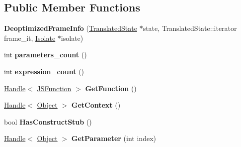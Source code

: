 \subsection*{Public Member Functions}
\begin{DoxyCompactItemize}
\item 
{\bfseries Deoptimized\+Frame\+Info} (\hyperlink{classv8_1_1internal_1_1_translated_state}{Translated\+State} $\ast$state, Translated\+State\+::iterator frame\+\_\+it, \hyperlink{classv8_1_1internal_1_1_isolate}{Isolate} $\ast$isolate)\hypertarget{classv8_1_1internal_1_1_deoptimized_frame_info_abcd9e3b305e42e71e91aa22fd0e74efc}{}\label{classv8_1_1internal_1_1_deoptimized_frame_info_abcd9e3b305e42e71e91aa22fd0e74efc}

\item 
int {\bfseries parameters\+\_\+count} ()\hypertarget{classv8_1_1internal_1_1_deoptimized_frame_info_ace9c74d42d04b117979611044f6adc68}{}\label{classv8_1_1internal_1_1_deoptimized_frame_info_ace9c74d42d04b117979611044f6adc68}

\item 
int {\bfseries expression\+\_\+count} ()\hypertarget{classv8_1_1internal_1_1_deoptimized_frame_info_a86000b47a892ff78f37787ed131e61c9}{}\label{classv8_1_1internal_1_1_deoptimized_frame_info_a86000b47a892ff78f37787ed131e61c9}

\item 
\hyperlink{classv8_1_1internal_1_1_handle}{Handle}$<$ \hyperlink{classv8_1_1internal_1_1_j_s_function}{J\+S\+Function} $>$ {\bfseries Get\+Function} ()\hypertarget{classv8_1_1internal_1_1_deoptimized_frame_info_addf293d436f9b12f7eda3b732fc08afd}{}\label{classv8_1_1internal_1_1_deoptimized_frame_info_addf293d436f9b12f7eda3b732fc08afd}

\item 
\hyperlink{classv8_1_1internal_1_1_handle}{Handle}$<$ \hyperlink{classv8_1_1internal_1_1_object}{Object} $>$ {\bfseries Get\+Context} ()\hypertarget{classv8_1_1internal_1_1_deoptimized_frame_info_a41b2845faf5e159c8164b0cc1082f77a}{}\label{classv8_1_1internal_1_1_deoptimized_frame_info_a41b2845faf5e159c8164b0cc1082f77a}

\item 
bool {\bfseries Has\+Construct\+Stub} ()\hypertarget{classv8_1_1internal_1_1_deoptimized_frame_info_a89e933d5994a7a794280d8d56f749369}{}\label{classv8_1_1internal_1_1_deoptimized_frame_info_a89e933d5994a7a794280d8d56f749369}

\item 
\hyperlink{classv8_1_1internal_1_1_handle}{Handle}$<$ \hyperlink{classv8_1_1internal_1_1_object}{Object} $>$ {\bfseries Get\+Parameter} (int index)\hypertarget{classv8_1_1internal_1_1_deoptimized_frame_info_af3c4c6fbbfed06a8b4b2f765542656ea}{}\label{classv8_1_1internal_1_1_deoptimized_frame_info_af3c4c6fbbfed06a8b4b2f765542656ea}


\end{DoxyCompactItemize}
